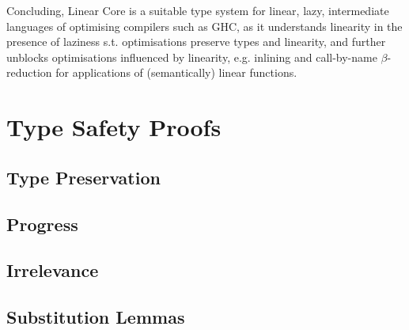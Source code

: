 \documentclass[acmsmall, screen, review]{acmart}
\begin{document}
Concluding, Linear Core is a suitable type system for linear, lazy,
intermediate languages of optimising compilers such as GHC, as it understands
linearity in the presence of laziness s.t. optimisations preserve types and
linearity, and further unblocks optimisations influenced by linearity, e.g.
inlining and call-by-name $\beta$-reduction for applications of (semantically)
linear functions.





\appendix

\section{Type Safety Proofs}

\subsection{Type Preservation\label{sec:proof:type-preservation}}



\subsection{Progress\label{sec:proof:progress}}



\subsection{Irrelevance\label{sec:proof:irrelevance}}



\subsection{Substitution Lemmas\label{sec:proof:substitution-lemmas}}




\end{document}
